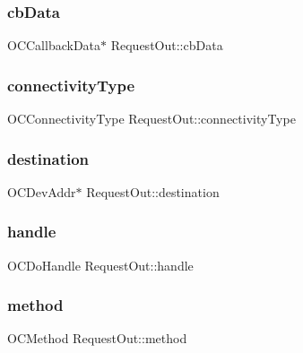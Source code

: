 \subsubsection{\texorpdfstring{cb\+Data}{cbData}}
{\footnotesize\ttfamily O\+C\+Callback\+Data$\ast$ Request\+Out\+::cb\+Data}

\hypertarget{struct_request_out_aabcaf8e6e1918ddcd8977d4925f2721a}{}\label{struct_request_out_aabcaf8e6e1918ddcd8977d4925f2721a} 
\subsubsection{\texorpdfstring{connectivity\+Type}{connectivityType}}
{\footnotesize\ttfamily O\+C\+Connectivity\+Type Request\+Out\+::connectivity\+Type}

\hypertarget{struct_request_out_ab71b7738ea6f781f3403de9b4fc2d459}{}\label{struct_request_out_ab71b7738ea6f781f3403de9b4fc2d459} 
\subsubsection{\texorpdfstring{destination}{destination}}
{\footnotesize\ttfamily O\+C\+Dev\+Addr$\ast$ Request\+Out\+::destination}

\hypertarget{struct_request_out_a37e7f41a35721d5525cd1b68e5dc4690}{}\label{struct_request_out_a37e7f41a35721d5525cd1b68e5dc4690} 
\subsubsection{\texorpdfstring{handle}{handle}}
{\footnotesize\ttfamily O\+C\+Do\+Handle Request\+Out\+::handle}

\hypertarget{struct_request_out_a7a8c0fad40c816c2ccfadeae5f598dce}{}\label{struct_request_out_a7a8c0fad40c816c2ccfadeae5f598dce} 
\subsubsection{\texorpdfstring{method}{method}}
{\footnotesize\ttfamily O\+C\+Method Request\+Out\+::method}

